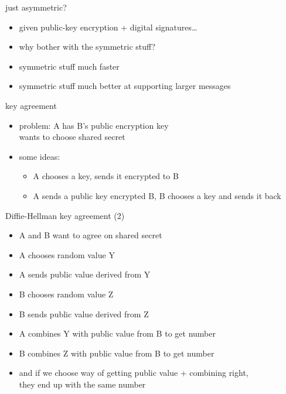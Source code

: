 \begin{frame}{just asymmetric?}
    \begin{itemize}
    \item given public-key encryption + digital signatures\ldots
    \item why bother with the symmetric stuff?
    \vspace{.5cm}
    \item symmetric stuff much faster
    \item symmetric stuff much better at supporting larger messages
    \end{itemize}
\end{frame}

\begin{frame}{key agreement}
    \begin{itemize}
    \item problem: A has B's public encryption key \\
        wants to choose shared secret 
    \vspace{.5cm}
    \item some ideas:
        \begin{itemize}
        \item A chooses a key, sends it encrypted to B
        \item A sends a public key encrypted B, B chooses a key and sends it back
        \end{itemize}
    \end{itemize}
\end{frame}

\begin{frame}{Diffie-Hellman key agreement (2)}
\begin{itemize}
\item A and B want to agree on shared secret
\vspace{.5cm}
\item A chooses random value Y
\item A sends public value derived from Y
\item B chooses random value Z
\item B sends public value derived from Z
\item A combines Y with public value from B to get number
\item B combines Z with public value from B to get number
\vspace{.5cm}
\item and if we choose way of getting public value + combining right,\\
they end up with the same number
\end{itemize}
\end{frame}

